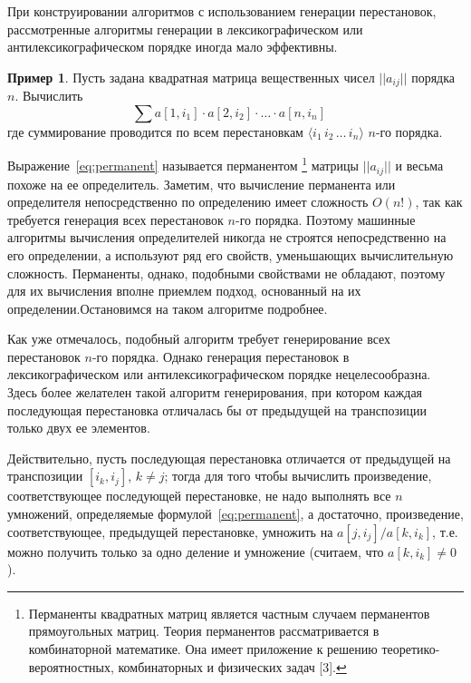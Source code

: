 \documentclass[12pt,a4paper]{article}
\theoremstyle{plain}
\theoremstyle{definition}
\newtheorem*{example}{Пример}
\theoremstyle{remark}
\begin{document}
При конструировании алгоритмов с использованием генерации перестановок, рассмотренные алгоритмы генерации в лексикографическом или антилексикографическом порядке иногда мало эффективны.

\begin{example}
Пусть задана квадратная матрица вещественных чисел $||a_{ij}||$ порядка $n$. Вычислить
\begin{equation}
\label{eq:permanent}
\sum a[1,i_1]\cdot a[2,i_2]\cdot \ldots \cdot a[n,i_n]\quad
\end{equation}
где суммирование проводится по всем перестановкам $\langle i_1\, i_2\, \ldots\, i_n\rangle$ $n$-го порядка.
\end{example}

Выражение~\eqref{eq:permanent} называется перманентом
\footnote{Перманенты квадратных матриц является частным случаем перманентов прямоугольных матриц. Теория перманентов рассматривается в комбинаторной математике. Она имеет приложение к решению теоретико-вероятностных, комбинаторных и физических задач [3].}
матрицы $||a_{ij}||$ и весьма похоже на ее определитель. Заметим, что вычисление перманента или определителя
непосредственно по определению имеет сложность $O(n!)$, так как требуется генерация всех перестановок $n$-го порядка. Поэтому машинные алгоритмы вычисления определителей никогда не строятся непосредственно на его определении, а используют ряд его свойств, уменьшающих вычислительную сложность. Перманенты, однако, подобными свойствами не обладают, поэтому для их вычисления вполне приемлем подход, основанный на их определении.Остановимся на таком алгоритме подробнее.

Как уже отмечалось, подобный алгоритм требует генерирование всех перестановок $n$-го порядка. Однако генерация перестановок в лексикографическом или антилексикографическом порядке нецелесообразна. Здесь более желателен такой алгоритм генерирования, при котором каждая последующая перестановка отличалась бы от предыдущей на транспозиции только двух ее элементов.

Действительно, пусть последующая перестановка отличается от предыдущей на транспозиции $[i_k,i_j]$, $k\ne j$; тогда для того чтобы вычислить произведение, соответствующее последующей перестановке, не надо выполнять все $n$ умножений, определяемые формулой~\eqref{eq:permanent}, а достаточно, произведение, соответствующее, предыдущей перестановке, умножить на $a[j,i_j]/a[k,i_k]$, т.е. можно получить только за одно деление и умножение (считаем, что $a[k,i_k]\ne 0$).
\end{document}
